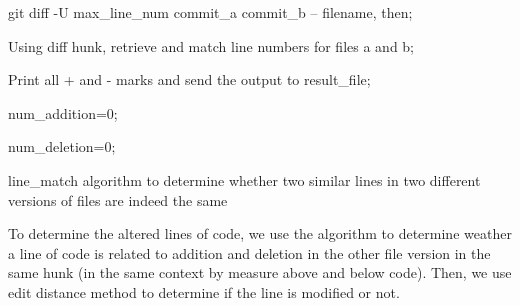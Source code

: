 \begin{algorithm}

  git diff  -U max\_line\_num  commit\_a commit\_b  --  filename, then; 
  
  Using diff hunk, retrieve and match line numbers for files a and b; 
 
 Print all + and - marks and send the output to result\_file; 

num\_addition=0;

num\_deletion=0;

 
 
 
 \caption{ line\_match algorithm to determine whether two similar lines in two different versions of files are indeed the same}
 \label {match}
\end{algorithm}


To determine the altered lines of code, we use the algorithm to determine weather a line of code is related to addition and deletion in the other file version in the same hunk (in the same context by measure above and below code). Then, we use edit distance method to determine if the line is modified or not.
